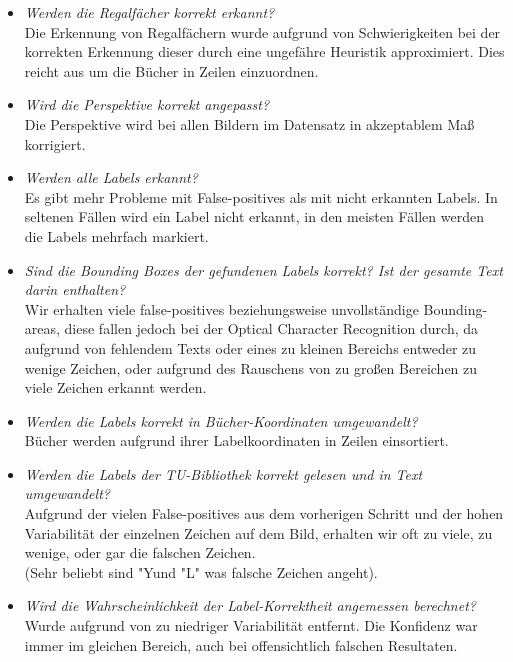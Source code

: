 \documentclass[paper=A4, deutsch]{scrartcl}
\begin{document}
\begin{itemize}
	\item \textit{Werden die Regalfächer korrekt erkannt?}\\
		  Die Erkennung von Regalfächern wurde aufgrund von Schwierigkeiten bei der korrekten Erkennung dieser durch eine ungefähre Heuristik approximiert. Dies reicht aus um die Bücher in Zeilen einzuordnen.
		  
	\item \textit{Wird die Perspektive korrekt angepasst?}\\
		  Die Perspektive wird bei allen Bildern im Datensatz in akzeptablem Maß korrigiert.
		  
	\item \textit{Werden alle Labels erkannt?}\\
		  Es gibt mehr Probleme mit False-positives als mit nicht erkannten Labels. In seltenen Fällen wird ein Label nicht  erkannt, in den meisten Fällen werden die Labels mehrfach markiert.
		  
	\item \textit{Sind die Bounding Boxes der gefundenen Labels korrekt? Ist der gesamte Text darin enthalten?}\\
		  Wir erhalten viele false-positives beziehungsweise unvollständige Bounding-areas, diese fallen jedoch bei der Optical Character Recognition durch, da aufgrund von fehlendem Texts oder eines zu kleinen Bereichs entweder zu wenige Zeichen, oder aufgrund des Rauschens von zu großen Bereichen zu viele Zeichen erkannt werden.
		  
	\item \textit{Werden die Labels korrekt in Bücher-Koordinaten umgewandelt?}\\
		  Bücher werden aufgrund ihrer Labelkoordinaten in Zeilen einsortiert.
		  
	\item \textit{Werden die Labels der TU-Bibliothek korrekt gelesen und in Text umgewandelt?}\\
		  Aufgrund der vielen False-positives aus dem vorherigen Schritt und der hohen Variabilität der einzelnen Zeichen auf dem Bild, erhalten wir oft zu viele, zu wenige, oder gar die falschen Zeichen.\\(Sehr beliebt sind "Y\dq  und "L" was falsche Zeichen angeht).
		  
	\item \textit{Wird die Wahrscheinlichkeit der Label-Korrektheit angemessen berechnet?}\\
		  Wurde aufgrund von zu niedriger Variabilität entfernt. Die Konfidenz war immer im gleichen Bereich, auch bei offensichtlich falschen Resultaten.
		  
\end{itemize}
\end{document}
